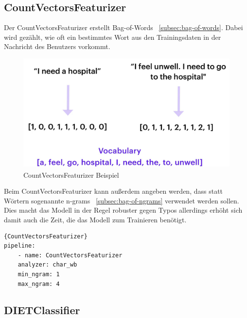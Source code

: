 \subsection{CountVectorsFeaturizer}\label{subsec:count-vectors-featurizer}

Der CountVectorsFeaturizer erstellt Bag-of-Words ~\ref{subsec:bag-of-words}.
Dabei wird gezählt, wie oft ein bestimmtes Wort aus den Trainingsdaten in der Nachricht des Benutzers vorkommt.\cite{countVectorsFeaturizer, pipelineConfigurationVideo, pipelineComponentsYoutube, rasaMasterclassCountVectorsFeaturizer}

\begin{figure}[hbt!]
    \centering
    \includegraphics[scale=0.25]{pics/countvectorsfeaturizer}
    \caption{CountVectorsFeaturizer Beispiel~\cite{pipelineConfigurationVideo}}
    \label{fig:CountVectorsFeaturizer}
\end{figure}

Beim CountVectorsFeaturizer kann außerdem angeben werden, dass statt Wörtern sogenannte n-grams ~\ref{subsec:bag-of-ngrams} verwendet werden sollen.
Dies macht das Modell in der Regel robuster gegen Typos allerdings erhöht sich damit auch die Zeit, die das Modell zum Trainieren benötigt.\cite{countVectorsFeaturizer, pipelineConfigurationVideo, pipelineComponentsYoutube, rasaMasterclassCountVectorsFeaturizer}

\begin{lstlisting}[label={lst:count-vectors-featurizer},caption={CountVectorsFeaturizer}]{CountVectorsFeaturizer}
pipeline:
    - name: CountVectorsFeaturizer
    analyzer: char_wb
    min_ngram: 1
    max_ngram: 4
\end{lstlisting}

\subsection{DIETClassifier}\label{subsec:dietclassifier}

